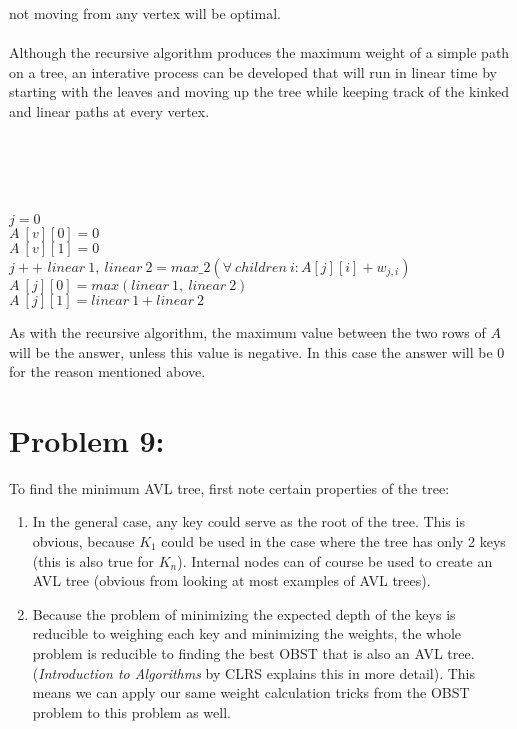 \documentclass[12pt]{article}
\begin{document}
not moving from any vertex will be optimal.\\\\
Although the recursive algorithm produces the maximum weight of a simple path
on a tree, an interative process can be developed that will run in linear
time by starting with the leaves and moving up the tree while keeping
track of the kinked and linear paths at every vertex.\\\\
\begin{algorithm}[H]
\\
\\
\\
$j = 0$\\
{$A\ [v][0] = 0$\\
$A\ [v][1] = 0$\\
$j++$}
{$linear\ 1,\ linear\ 2 = max\_2(\forall\ children\ i: A[j][i]+w_{j,i})$\\
$A\ [j][0] = max(linear\ 1,\ linear\ 2)$\\
$A\ [j][1] = linear\ 1 + linear\ 2$\\
}
\end{algorithm}
As with the recursive algorithm, the maximum value between the two rows of $A$
will be the answer, unless this value is negative.  In this case the answer
will be $0$ for the reason mentioned above.

\section*{Problem 9: }

To find the minimum AVL tree, first note certain properties of the tree:

\begin{enumerate}
	\item In the general case, any key could serve as the root of the tree. This is obvious, because $K_1$ could be used in the case where the tree has only 2 keys (this is also true for $K_n$). Internal nodes can of course be used to create an AVL tree (obvious from looking at most examples of AVL trees).
	\item Because the problem of minimizing the expected depth of the keys is reducible to weighing each key and minimizing the weights, the whole problem is reducible to finding the best OBST that is also an AVL tree. (\textit{Introduction to Algorithms} by CLRS explains this in more detail). This means we can apply our same weight calculation tricks from the OBST problem to this problem as well.
\end{enumerate}
\end{document}
